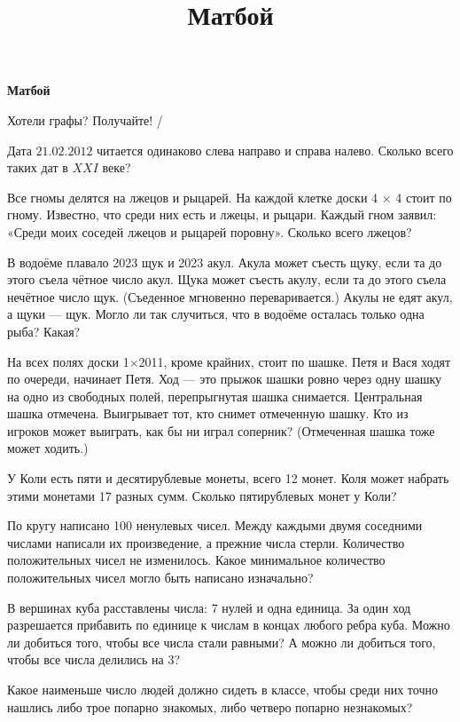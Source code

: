 \centerline{\bf \Huge Матбой}
\title{ Матбой}

\begin{flushright}
    \scriptsize Хотели графы? Получайте!  /  
\end{flushright}
Дата $21.02.2012$ читается одинаково слева направо
и справа налево. Сколько всего таких дат в $XXI$ веке?

 Все гномы делятся на лжецов и рыцарей. На каждой
клетке доски 4 × 4 стоит по гному. Известно, что среди них есть
и лжецы, и рыцари. Каждый гном заявил: «Среди моих соседей лжецов и рыцарей поровну». Сколько всего лжецов?

 В водоёме плавало 2023 щук и 2023 акул. Акула может съесть щуку, если та до этого съела чётное число акул. Щука
может съесть акулу, если та до этого съела нечётное число щук.
(Съеденное мгновенно переваривается.) Акулы не едят акул, а щуки –– щук. Могло ли так случиться, что в водоёме осталась только
одна рыба? Какая?

На всех полях доски 1×2011, кроме крайних, стоит
по шашке. Петя и Вася ходят по очереди, начинает Петя. Ход –– это
прыжок шашки ровно через одну шашку на одно из свободных полей, перепрыгнутая шашка снимается. Центральная шашка отмечена. Выигрывает тот, кто снимет отмеченную шашку. Кто из игроков
может выиграть, как бы ни играл соперник? (Отмеченная шашка
тоже может ходить.)

У Коли есть пяти и десятирублевые монеты, всего 12 монет. Коля может
набрать этими монетами 17 разных сумм. Сколько пятирублевых монет у Коли?

По кругу написано 100 ненулевых чисел. Между каждыми двумя соседними числами написали их произведение, а прежние числа стерли. Количество положительных чисел не изменилось. Какое минимальное количество положительных чисел могло быть написано изначально?

 В вершинах куба расставлены числа: 7 нулей и одна единица. За один ход разрешается прибавить по единице к числам в концах любого ребра куба. Можно ли добиться того, чтобы все числа стали равными? А можно ли добиться того, чтобы все числа делились на 3?

 Какое наименьше число людей должно сидеть в классе, чтобы среди них точно нашлись либо трое попарно знакомых, либо четверо попарно незнакомых?